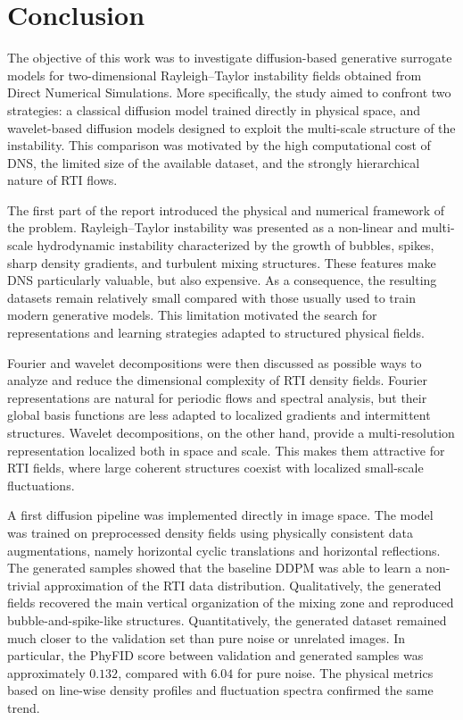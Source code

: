 \chapter*{Conclusion}

The objective of this work was to investigate diffusion-based generative
surrogate models for two-dimensional Rayleigh--Taylor instability fields
obtained from Direct Numerical Simulations. More specifically, the study aimed
to confront two strategies: a classical diffusion model trained directly in
physical space, and wavelet-based diffusion models designed to exploit the
multi-scale structure of the instability. This comparison was motivated by the
high computational cost of DNS, the limited size of the available dataset, and
the strongly hierarchical nature of RTI flows.

The first part of the report introduced the physical and numerical framework of
the problem. Rayleigh--Taylor instability was presented as a non-linear and
multi-scale hydrodynamic instability characterized by the growth of bubbles,
spikes, sharp density gradients, and turbulent mixing structures. These
features make DNS particularly valuable, but also expensive. As a consequence,
the resulting datasets remain relatively small compared with those usually used
to train modern generative models. This limitation motivated the search for
representations and learning strategies adapted to structured physical fields.

Fourier and wavelet decompositions were then discussed as possible ways to
analyze and reduce the dimensional complexity of RTI density fields. Fourier
representations are natural for periodic flows and spectral analysis, but their
global basis functions are less adapted to localized gradients and intermittent
structures. Wavelet decompositions, on the other hand, provide a
multi-resolution representation localized both in space and scale. This makes
them attractive for RTI fields, where large coherent structures coexist with
localized small-scale fluctuations.

A first diffusion pipeline was implemented directly in image space. The model
was trained on preprocessed density fields using physically consistent data
augmentations, namely horizontal cyclic translations and horizontal
reflections. The generated samples showed that the baseline DDPM was able to
learn a non-trivial approximation of the RTI data distribution. Qualitatively,
the generated fields recovered the main vertical organization of the mixing
zone and reproduced bubble-and-spike-like structures. Quantitatively, the
generated dataset remained much closer to the validation set than pure noise or
unrelated images. In particular, the PhyFID score between validation and
generated samples was approximately $0.132$, compared with $6.04$ for pure
noise. The physical metrics based on line-wise density profiles and fluctuation
spectra confirmed the same trend.

